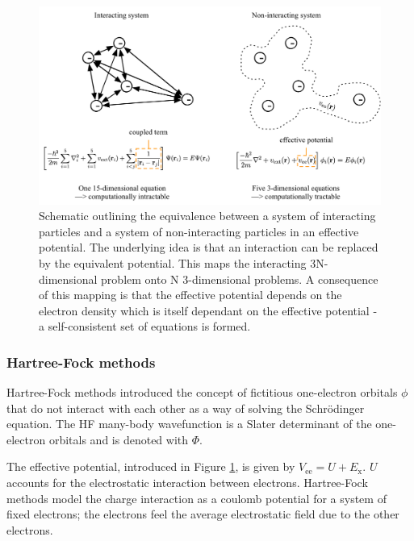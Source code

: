 \begin{figure}[h]
\centering
  \includegraphics[width=1.0\columnwidth]{figures/ch3/decouple.png}
  \caption[Schematic outlining the equivalence between interacting and non-interacting systems]{Schematic outlining the equivalence between a system of interacting particles and a system of non-interacting particles in an effective potential. The underlying idea is that an interaction can be replaced by the equivalent potential. This maps the interacting 3N-dimensional problem onto N 3-dimensional problems. A consequence of this mapping is that the effective potential depends on the electron density which is itself dependant on the effective potential - a self-consistent set of equations is formed.} %
  \label{decouple}
\end{figure}

\subsubsection{Hartree-Fock methods}

Hartree-Fock methods introduced the concept of fictitious one-electron orbitals $\phi$ that do not interact with each other as a way of solving the Schr\"{o}dinger equation. The HF many-body wavefunction is a Slater determinant of the one-electron orbitals and is denoted with $\Phi$. 

The effective potential, introduced in Figure \ref{decouple}, is given by $V_{\textrm{ee}} = U + E_{\textrm{x}}$. $U$ accounts for the electrostatic interaction between electrons. Hartree-Fock methods model the charge interaction as a coulomb potential for a system of fixed electrons; the electrons feel the average electrostatic field due to the other electrons.

